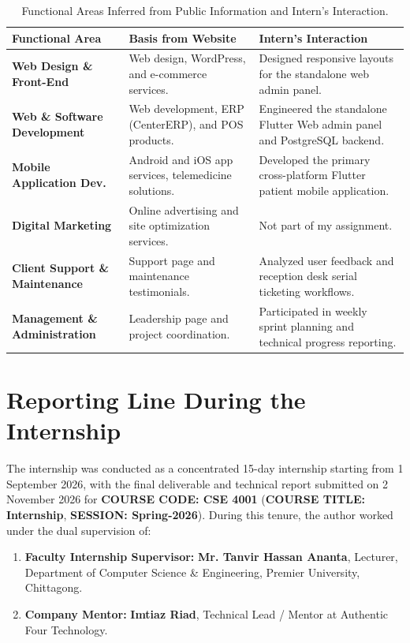 \documentclass[11pt,a4paper,oneside]{report}
\begin{document}
\begin{table}[H]
\centering
\small
\begin{tabularx}{\textwidth}{p{3.8cm}Xp{4.5cm}}
\toprule
\textbf{Functional Area} & \textbf{Basis from Website} & \textbf{Intern's Interaction} \\
\midrule
\textbf{Web Design \& Front-End} & Web design, WordPress, and e-commerce services. & Designed responsive layouts for the standalone web admin panel. \\
\textbf{Web \& Software Development} & Web development, ERP (CenterERP), and POS products. & Engineered the standalone Flutter Web admin panel and PostgreSQL backend. \\
\textbf{Mobile Application Dev.} & Android and iOS app services, telemedicine solutions. & Developed the primary cross-platform Flutter patient mobile application. \\
\textbf{Digital Marketing} & Online advertising and site optimization services. & Not part of my assignment. \\
\textbf{Client Support \& Maintenance} & Support page and maintenance testimonials. & Analyzed user feedback and reception desk serial ticketing workflows. \\
\textbf{Management \& Administration} & Leadership page and project coordination. & Participated in weekly sprint planning and technical progress reporting. \\
\bottomrule
\end{tabularx}
\caption{Functional Areas Inferred from Public Information and Intern's Interaction.}
\label{tab:functional_areas}
\end{table}

\section{Reporting Line During the Internship}
The internship was conducted as a concentrated 15-day internship starting from 1 September 2026, with the final deliverable and technical report submitted on 2 November 2026 for \textbf{COURSE CODE: CSE 4001} (\textbf{COURSE TITLE: Internship}, \textbf{SESSION: Spring-2026}). During this tenure, the author worked under the dual supervision of:
\begin{enumerate}
    \item \textbf{Faculty Internship Supervisor:} \textbf{Mr. Tanvir Hassan Ananta}, Lecturer, Department of Computer Science \& Engineering, Premier University, Chittagong.
    \item \textbf{Company Mentor:} \textbf{Imtiaz Riad}, Technical Lead / Mentor at Authentic Four Technology.
\end{enumerate}
\end{document}
